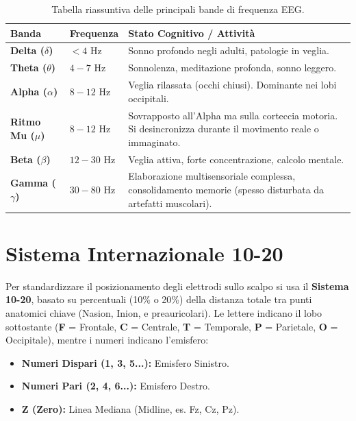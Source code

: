 \vspace{0.5cm}
\begin{table}[h!]
    \centering
    \begin{tabular}{|p{3cm}|p{2cm}|p{8cm}|}
        \hline
        \textbf{Banda} & \textbf{Frequenza} & \textbf{Stato Cognitivo / Attività} \\
        \hline
        \textbf{Delta ($\delta$)} & $< 4$ Hz & Sonno profondo negli adulti, patologie in veglia. \\
        \hline
        \textbf{Theta ($\theta$)} & $4 - 7$ Hz & Sonnolenza, meditazione profonda, sonno leggero. \\
        \hline
        \textbf{Alpha ($\alpha$)} & $8 - 12$ Hz & Veglia rilassata (occhi chiusi). Dominante nei lobi occipitali. \\
        \hline
        \textbf{Ritmo Mu ($\mu$)} & $8 - 12$ Hz & Sovrapposto all'Alpha ma sulla corteccia motoria. Si desincronizza durante il movimento reale o immaginato. \\
        \hline
        \textbf{Beta ($\beta$)} & $12 - 30$ Hz & Veglia attiva, forte concentrazione, calcolo mentale. \\
        \hline
        \textbf{Gamma ($\gamma$)} & $30 - 80$ Hz & Elaborazione multisensoriale complessa, consolidamento memorie (spesso disturbata da artefatti muscolari). \\
        \hline
    \end{tabular}
    \caption{Tabella riassuntiva delle principali bande di frequenza EEG.}
\end{table}
\vspace{0.5cm}

\section{Sistema Internazionale 10-20}
Per standardizzare il posizionamento degli elettrodi sullo scalpo si usa il \textbf{Sistema 10-20}, basato su percentuali (10\% o 20\%) della distanza totale tra punti anatomici chiave (Nasion, Inion, e preauricolari). Le lettere indicano il lobo sottostante (\textbf{F} = Frontale, \textbf{C} = Centrale, \textbf{T} = Temporale, \textbf{P} = Parietale, \textbf{O} = Occipitale), mentre i numeri indicano l'emisfero:
\begin{itemize}
    \item \textbf{Numeri Dispari (1, 3, 5...):} Emisfero Sinistro.
    \item \textbf{Numeri Pari (2, 4, 6...):} Emisfero Destro.
    \item \textbf{Z (Zero):} Linea Mediana (Midline, es. Fz, Cz, Pz).
\end{itemize}

